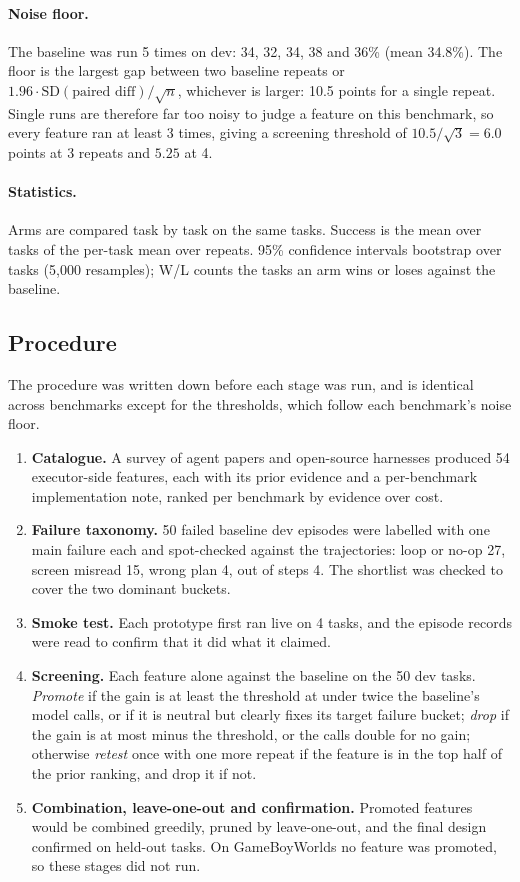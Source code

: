 \paragraph{Noise floor.} The baseline was run 5 times on dev: 34, 32, 34, 38 and 36\% (mean 34.8\%). The floor is
the largest gap between two baseline repeats or $1.96\cdot\mathrm{SD}(\text{paired diff})/\sqrt{n}$, whichever is
larger: 10.5 points for a single repeat. Single runs are therefore far too noisy to judge a feature on this
benchmark, so every feature ran at least 3 times, giving a screening threshold of $10.5/\sqrt{3} = 6.0$ points at 3
repeats and $5.25$ at 4.

\paragraph{Statistics.} Arms are compared task by task on the same tasks. Success is the mean over tasks of the
per-task mean over repeats. 95\% confidence intervals bootstrap over tasks (5{,}000 resamples); W/L counts the tasks
an arm wins or loses against the baseline.

\subsection{Procedure}

The procedure was written down before each stage was run, and is identical across benchmarks except for the
thresholds, which follow each benchmark's noise floor.
\begin{enumerate}
  \item \textbf{Catalogue.} A survey of agent papers and open-source harnesses produced 54 executor-side features,
  each with its prior evidence and a per-benchmark implementation note, ranked per benchmark by evidence over cost.
  \item \textbf{Failure taxonomy.} 50 failed baseline dev episodes were labelled with one main failure each and
  spot-checked against the trajectories: loop or no-op 27, screen misread 15, wrong plan 4, out of steps 4. The
  shortlist was checked to cover the two dominant buckets.
  \item \textbf{Smoke test.} Each prototype first ran live on 4 tasks, and the episode records were read to confirm
  that it did what it claimed.
  \item \textbf{Screening.} Each feature alone against the baseline on the 50 dev tasks. \emph{Promote} if the gain
  is at least the threshold at under twice the baseline's model calls, or if it is neutral but clearly fixes its
  target failure bucket; \emph{drop} if the gain is at most minus the threshold, or the calls double for no gain;
  otherwise \emph{retest} once with one more repeat if the feature is in the top half of the prior ranking, and drop
  it if not.
  \item \textbf{Combination, leave-one-out and confirmation.} Promoted features would be combined greedily, pruned by
  leave-one-out, and the final design confirmed on held-out tasks. On GameBoyWorlds no feature was promoted, so these
  stages did not run.
\end{enumerate}

